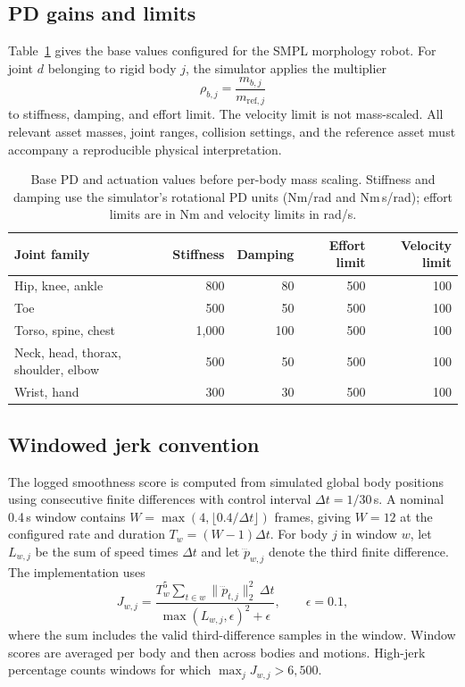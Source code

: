 \subsection{PD gains and limits}\label{app:control}

Table~\ref{tab:pd_parameters} gives the base values configured for the
SMPL morphology robot. For joint $d$ belonging to rigid body $j$, the
simulator applies the multiplier
\begin{equation}
    \rho_{b,j} = \frac{m_{b,j}}{m_{\mathrm{ref},j}}
\end{equation}
to stiffness, damping, and effort limit. The velocity limit is not mass-scaled.
All relevant asset masses, joint ranges, collision settings, and the reference
asset must accompany a reproducible physical interpretation.

\begin{table}[htbp]
\centering
\small
\caption{Base PD and actuation values before per-body mass scaling.
Stiffness and damping use the simulator's rotational PD units
(Nm/rad and Nm\,s/rad); effort limits are in Nm and velocity limits in rad/s.}\label{tab:pd_parameters}
\begin{tabular}{lrrrr}
\toprule
Joint family & Stiffness & Damping & Effort limit & Velocity limit \\
\midrule
Hip, knee, ankle & 800 & 80 & 500 & 100 \\
Toe & 500 & 50 & 500 & 100 \\
Torso, spine, chest & 1,000 & 100 & 500 & 100 \\
Neck, head, thorax, shoulder, elbow & 500 & 50 & 500 & 100 \\
Wrist, hand & 300 & 30 & 500 & 100 \\
\bottomrule
\end{tabular}
\end{table}

\subsection{Windowed jerk convention}\label{app:smoothness}

The logged smoothness score is computed from simulated global body positions
using consecutive finite differences with control interval
$\Delta t=1/30$\,s. A nominal 0.4\,s window contains
$W=\max(4,\lfloor0.4/\Delta t\rfloor)$ frames, giving $W=12$ at the
configured rate and duration $T_w=(W-1)\Delta t$. For body $j$ in window $w$,
let $L_{w,j}$ be the sum of speed times $\Delta t$ and let
$\dddot{p}_{w,j}$ denote the third finite difference. The implementation uses
\begin{equation}
    J_{w,j} =
    \frac{T_w^5
      \sum_{t\in w}\|\dddot{p}_{t,j}\|_2^2\,\Delta t}
    {\max(L_{w,j},\epsilon)^2+\epsilon},
    \qquad \epsilon=0.1,
    \label{eq:jerk}
\end{equation}
where the sum includes the valid third-difference samples in the window.
Window scores are averaged per body and then across bodies and motions.
High-jerk percentage counts windows for which
$\max_j J_{w,j}>6{,}500$.

